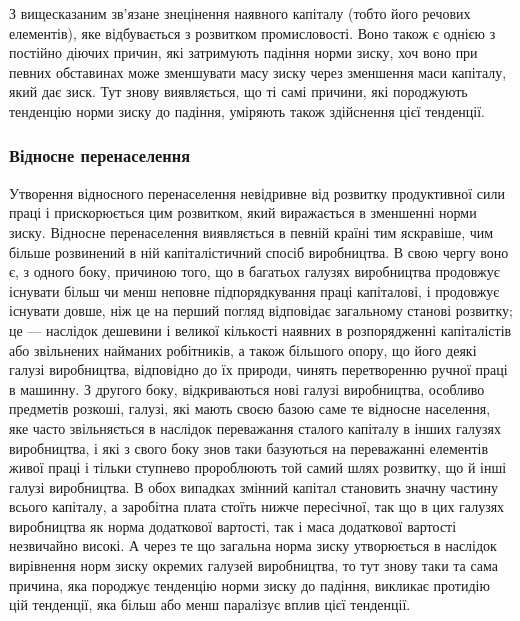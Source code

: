 
З вищесказаним зв’язане знецінення наявного капіталу (тобто його речових елементів), яке
відбувається з розвитком промисловості. Воно також є однією з постійно діючих причин, які затримують
падіння норми зиску, хоч воно при певних обставинах може зменшувати масу зиску через зменшення маси
капіталу, який дає зиск. Тут знову виявляється, що ті самі причини, які породжують тенденцію норми
зиску до падіння, уміряють також здійснення цієї тенденції.

\subsubsection{Відносне перенаселення}
Утворення відносного перенаселення невідривне від розвитку продуктивної сили праці і прискорюється
цим розвитком, який виражається в зменшенні норми зиску. Відносне перенаселення виявляється в певній
країні тим яскравіше, чим більше розвинений в ній капіталістичний спосіб виробництва. В свою чергу
воно є, з одного боку, причиною того, що в багатьох галузях виробництва продовжує існувати більш чи
менш неповне підпорядкування праці капіталові, і продовжує існувати довше, ніж це на перший погляд
відповідає загальному станові розвитку; це — наслідок дешевини і великої кількості наявних в
розпорядженні капіталістів або звільнених найманих робітників, а також більшого опору, що його деякі
галузі виробництва, відповідно до
їх природи, чинять перетворенню ручної праці в машинну. З другого боку, відкриваються нові галузі
виробництва, особливо предметів розкоші, галузі, які мають своєю базою саме те відносне населення,
яке часто звільняється в наслідок переважання сталого капіталу в інших галузях виробництва, і які з
свого боку знов таки базуються на переважанні елементів живої праці і тільки ступнево пророблюють
той самий шлях розвитку, що й інші галузі виробництва. В обох випадках змінний капітал становить
значну частину всього капіталу, а заробітна плата стоїть нижче пересічної, так що в цих галузях
виробництва як норма додаткової вартості, так і маса додаткової вартості незвичайно високі. А через
те що загальна норма зиску утворюється в наслідок вирівнення норм зиску окремих галузей виробництва,
то
тут знову таки та сама причина, яка породжує тенденцію норми зиску до падіння, викликає протидію цій
тенденції, яка більш або менш паралізує вплив цієї тенденції.

